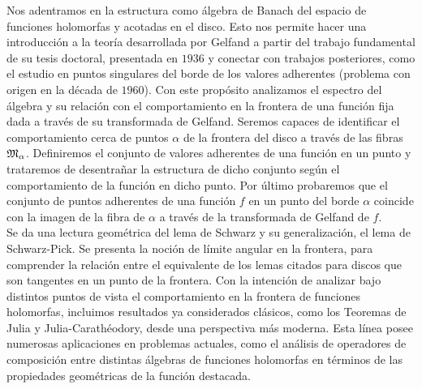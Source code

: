 Nos adentramos en la estructura como álgebra de Banach del espacio de funciones holomorfas y acotadas en el disco. Esto nos permite hacer una introducción a la teoría desarrollada por Gelfand a partir del trabajo fundamental de su tesis doctoral, presentada en $1936$ y conectar con trabajos posteriores, como el estudio en puntos singulares del borde de los valores adherentes (problema con origen en la década de $1960$). Con este propósito analizamos el espectro del álgebra y su relación con el comportamiento en la frontera de una función fija dada a través de su transformada de Gelfand. Seremos capaces de identificar el comportamiento cerca de puntos $\alpha$ de la frontera del disco a través de las fibras $\mathfrak{M}_\alpha$. Definiremos el conjunto de valores adherentes de una función en un punto y trataremos de desentrañar la estructura de dicho conjunto según el comportamiento de la función en dicho punto. Por último probaremos que el conjunto de puntos adherentes de una función $f$ en un punto del borde $\alpha$ coincide con la imagen de la fibra de $\alpha$ a través de la transformada de Gelfand de $f$. \\

Se da una lectura geométrica del lema de Schwarz y su generalización, el lema de Schwarz-Pick. Se presenta la noción de límite angular en la frontera, para comprender la relación entre el equivalente de los lemas citados para discos que son tangentes en un punto de la frontera. Con la intención de analizar bajo distintos puntos de vista el comportamiento en la frontera de funciones holomorfas, incluimos resultados ya considerados clásicos, como los Teoremas de Julia y Julia-Carathéodory, desde una perspectiva más moderna. Esta línea posee numerosas aplicaciones en problemas actuales, como el análisis de operadores de composición entre distintas álgebras de funciones holomorfas en términos de las propiedades geométricas de la función destacada. \\

